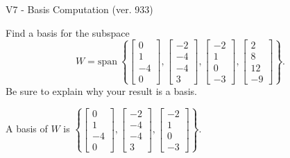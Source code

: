 \begin{exercise}
  \begin{exerciseTitle}V7 - Basis Computation (ver. 933)\end{exerciseTitle}
  \begin{exerciseStatement}
    Find a basis for the subspace 
\[W=\mathrm{span}\ \left\{\left[\begin{array}{r}
0 \\
1 \\
-4 \\
0
\end{array}\right] , \left[\begin{array}{r}
-2 \\
-4 \\
-4 \\
3
\end{array}\right] , \left[\begin{array}{r}
-2 \\
1 \\
0 \\
-3
\end{array}\right] , \left[\begin{array}{r}
2 \\
8 \\
12 \\
-9
\end{array}\right]\right\}.\]
 Be sure to explain why your result is a basis.


  \end{exerciseStatement}
  \begin{exerciseAnswer}
   A basis of \(W\) is  \(\left\{\left[\begin{array}{r}
0 \\
1 \\
-4 \\
0
\end{array}\right] , \left[\begin{array}{r}
-2 \\
-4 \\
-4 \\
3
\end{array}\right] , \left[\begin{array}{r}
-2 \\
1 \\
0 \\
-3
\end{array}\right]\right\}\).
  


  \end{exerciseAnswer}
\end{exercise}